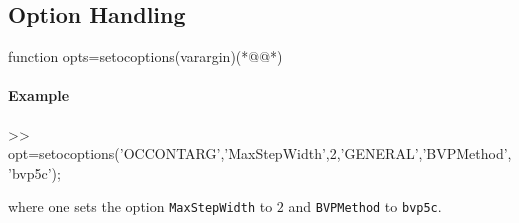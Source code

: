 \subsection{Option Handling}
\begin{matlab}
function opts=setocoptions(varargin)(*@@*)
%
%
%
%
\end{matlab}
\paragraph{Example}
\begin{matlab}
>> opt=setocoptions('OCCONTARG','MaxStepWidth',2,'GENERAL','BVPMethod','bvp5c');
\end{matlab}
where one sets the option \lstinline+MaxStepWidth+ to $2$ and \lstinline+BVPMethod+ to \lstinline+bvp5c+.

